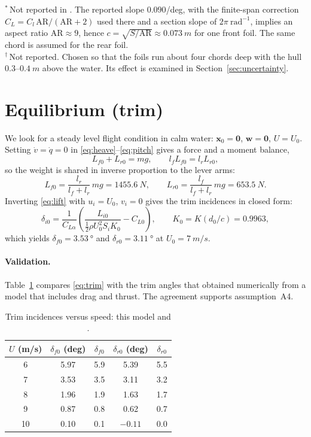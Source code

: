\documentclass[11pt,a4paper]{article}
\newcommand{\half}{\tfrac{1}{2}}
\begin{document}
\noindent$^{\ast}$\,Not reported in \cite{belime}. The reported slope
$0.090$/deg, with the finite-span correction $C_L=C_l\,\mathrm{AR}/(\mathrm{AR}+2)$
used there and a section slope of $2\pi\ \mathrm{rad^{-1}}$, implies an aspect ratio
$\mathrm{AR}\approx9$, hence $c=\sqrt{S/\mathrm{AR}}\approx\SI{0.073}{m}$ for one
front foil. The same chord is assumed for the rear foil.\\
$^{\dagger}$\,Not reported. Chosen so that the foils run about four chords deep
with the hull $0.3$--$\SI{0.4}{m}$ above the water. Its effect is examined in
Section~\ref{sec:uncertainty}.

\section{Equilibrium (trim)}

We look for a steady level flight condition in calm water:
$\bm x_0=\bm 0$, $\bm w=\bm 0$, $U=U_0$. Setting $\dot v=\dot q=0$ in
\eqref{eq:heave}--\eqref{eq:pitch} gives a force and a moment balance,
\[
L_{f0}+L_{r0}=mg, \qquad l_f L_{f0}=l_r L_{r0},
\]
so the weight is shared in inverse proportion to the lever arms:
\begin{equation}
L_{f0}=\frac{l_r}{l_f+l_r}\,mg=\SI{1455.6}{N}, \qquad
L_{r0}=\frac{l_f}{l_f+l_r}\,mg=\SI{653.5}{N}.
\end{equation}
Inverting \eqref{eq:lift} with $u_i=U_0$, $v_i=0$ gives the trim incidences in closed form:
\begin{equation}
\delta_{i0}=\frac{1}{C_{L\alpha}}
\left(\frac{L_{i0}}{\half\rho U_0^2 S_i K_0}-C_{L0}\right),
\qquad K_0=K(d_0/c)=0.9963 ,
\label{eq:trim}
\end{equation}
which yields $\delta_{f0}=\SI{3.53}{\degree}$ and $\delta_{r0}=\SI{3.11}{\degree}$
at $U_0=\SI{7}{m/s}$.

\paragraph{Validation.} Table~\ref{tab:trim} compares \eqref{eq:trim} with the
trim angles that \cite{belime} obtained numerically from a model that includes
drag and thrust. The agreement supports assumption~A4.

\begin{table}[h]
\centering
\caption{Trim incidences versus speed: this model and \cite{belime}.}
\label{tab:trim}
\begin{tabular}{@{}ccccc@{}}
\toprule
$U$ (\si{m/s}) & $\delta_{f0}$ (deg) & $\delta_{f0}$ \cite{belime} &
$\delta_{r0}$ (deg) & $\delta_{r0}$ \cite{belime} \\ \midrule
6  & 5.97 & 5.9 & 5.39 & 5.5 \\
7  & 3.53 & 3.5 & 3.11 & 3.2 \\
8  & 1.96 & 1.9 & 1.63 & 1.7 \\
9  & 0.87 & 0.8 & 0.62 & 0.7 \\
10 & 0.10 & 0.1 & $-0.11$ & 0.0 \\
\bottomrule
\end{tabular}
\end{table}
\end{document}
